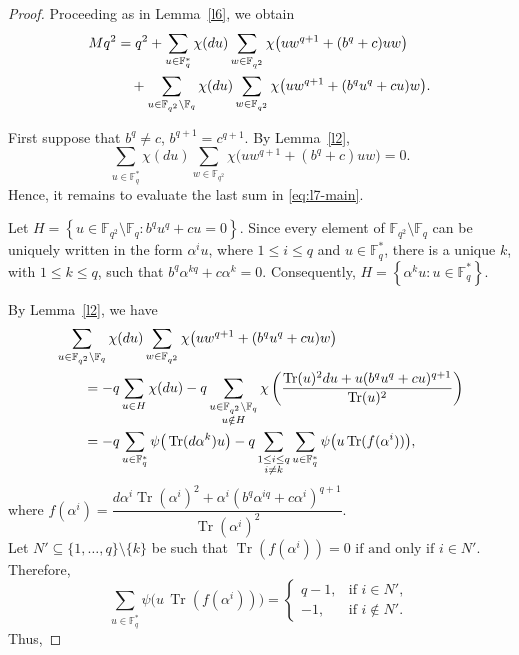 \documentclass[12pt]{amsart}
\theoremstyle{definition}
\theoremstyle{remark}
\numberwithin{equation}{section}
\begin{document}
\begin{proof}
Proceeding as in Lemma~\ref{l6}, we obtain
\begin{align}
Mq^2
&= q^2+\sum_{u\in\mathbb{F}_q^{*}}\chi(du)
\sum_{w\in\mathbb{F}_{q^2}}
\chi\big(uw^{q+1}+(b^q+c)uw\big) \notag\\
&\quad+\sum_{u\in\mathbb{F}_{q^2}\setminus\mathbb{F}_q}
\chi(du)\sum_{w\in\mathbb{F}_{q^2}}
\chi\big(uw^{q+1}+(b^qu^q+cu)w\big).
\label{eq:l7-main}
\end{align}

First suppose that
$b^q\neq c$, $b^{q+1}=c^{q+1}$.
By Lemma~\ref{l2},
\[
\sum_{u\in\mathbb{F}_q^{*}}\chi(du)
\sum_{w\in\mathbb{F}_{q^2}}
\chi\big(uw^{q+1}+(b^q+c)uw\big)=0.
\]
Hence, it remains to evaluate the last sum in
\eqref{eq:l7-main}.

Let
$H=\left\{
u\in\mathbb{F}_{q^2}\setminus\mathbb{F}_q:
b^qu^q+cu=0
\right\}.$
Since every element of $\mathbb{F}_{q^2}\setminus\mathbb{F}_q$ can be uniquely written in the form $\alpha^i u$, where $1\leq i\leq q$ and $u\in\mathbb{F}_q^*$, there is a unique $k$, with $1\leq k\leq q$, such that $
b^q\alpha^{kq}+c\alpha^k=0.
$ Consequently, $H=\left\{\alpha^k u:u\in\mathbb{F}_q^*\right\}.
$

By Lemma~\ref{l2}, we have
\begin{align}
&\sum_{u\in\mathbb{F}_{q^2}\setminus\mathbb{F}_q}
\chi(du)\sum_{w\in\mathbb{F}_{q^2}}
\chi\big(uw^{q+1}+(b^qu^q+cu)w\big) \notag\\
&\qquad =
-q\sum_{u\in H}\chi(du)
-q\sum_{\substack{
u\in\mathbb{F}_{q^2}\setminus\mathbb{F}_q\\
u\notin H}}
\chi\left(
\frac{
\operatorname{Tr}(u)^2du+
u(b^qu^q+cu)^{q+1}
}{
\operatorname{Tr}(u)^2
}
\right)\notag\\
&\qquad=-q\sum_{u\in\mathbb{F}_q^*}
\psi\big(\operatorname{Tr}(d\alpha^k)u\big) \notag
-q\sum_{\substack{1\leq i\leq q\\i\neq k}}
\sum_{u\in\mathbb{F}_q^*}
\psi\big(u\operatorname{Tr}(f(\alpha^i))\big),
\end{align}
where $f(\alpha^i)= \dfrac{d\alpha^i\operatorname{Tr}(\alpha^i)^2+\alpha^i(b^q\alpha^{iq}+c\alpha^i)^{q+1}}{\operatorname{Tr}(\alpha^i)^2}.$\\

Let $N' \subseteq \{1,\dots,q\}\setminus\{k\}$ be such that $ \operatorname{Tr}(f(\alpha^i))=0 \text{ if and only if } i \in N'. $ Therefore, $$ \sum_{u \in \mathbb{F}_q^{*}} \psi\big(u\,\operatorname{Tr}(f(\alpha^i))\big) = \begin{cases} q-1, & \text{if } i \in N',\\[1mm] -1, & \text{if } i \notin N'. \end{cases} $$  
Thus,


\end{proof}
\end{document}
